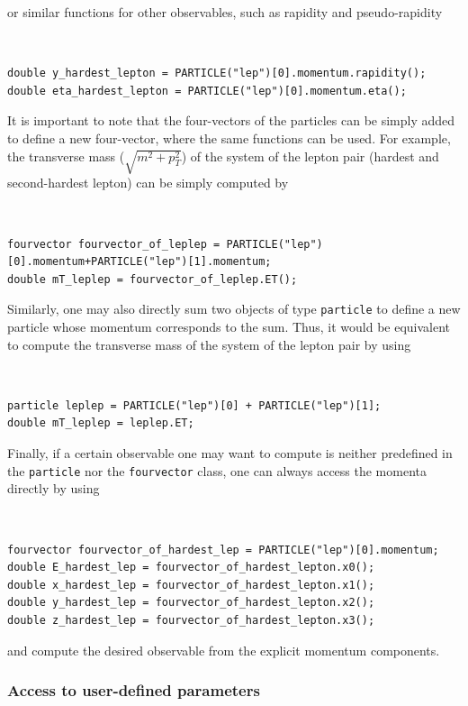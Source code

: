 \documentclass[english,11pt]{article}
\begin{document}
or similar functions for other observables, such as rapidity and pseudo-rapidity

{\tt
\begin{lstlisting}                                                   
double y_hardest_lepton = PARTICLE("lep")[0].momentum.rapidity();
double eta_hardest_lepton = PARTICLE("lep")[0].momentum.eta();
\end{lstlisting}
}

It is important to note that the four-vectors of the particles can be simply added to 
define a new four-vector, where the same functions can be used. For example, 
the transverse mass ($\sqrt{m^2+p_T^2}$) of the system of the lepton pair (hardest and second-hardest lepton) 
can be simply computed by

{\tt
\begin{lstlisting}                                                   
fourvector fourvector_of_leplep = PARTICLE("lep")[0].momentum+PARTICLE("lep")[1].momentum;
double mT_leplep = fourvector_of_leplep.ET();
\end{lstlisting}
}

Similarly, one may also directly sum two objects of type {\tt particle}
to define a new particle whose momentum corresponds to the sum. Thus, it would be equivalent
to compute the transverse mass of the system of the lepton pair by using
{\tt
\begin{lstlisting}                                                   
particle leplep = PARTICLE("lep")[0] + PARTICLE("lep")[1];
double mT_leplep = leplep.ET;
\end{lstlisting}
}

Finally, if a certain observable one may want to compute is neither predefined in the {\tt particle} 
nor the {\tt fourvector} class, one can always access the momenta directly by using

{\tt
\begin{lstlisting}                                                   
fourvector fourvector_of_hardest_lep = PARTICLE("lep")[0].momentum;
double E_hardest_lep = fourvector_of_hardest_lepton.x0();
double x_hardest_lep = fourvector_of_hardest_lepton.x1();
double y_hardest_lep = fourvector_of_hardest_lepton.x2();
double z_hardest_lep = fourvector_of_hardest_lepton.x3();
\end{lstlisting}
}

and compute the desired observable from the explicit momentum components.


\subsubsection{Access to user-defined parameters}
\end{document}
